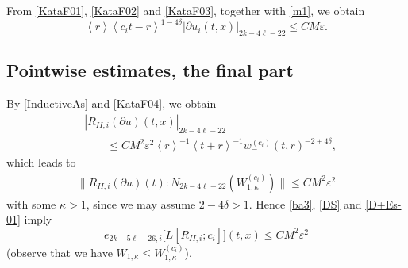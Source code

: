 \documentclass[12pt]{amsart}
\newcommand{\ve}{\varepsilon}
\newcommand{\pa}{\partial}
\newcommand{\jb}[1]{\left\langle #1 \right\rangle}
\newcommand{\norm}[2]{\|#1 \!:\! #2\|}
\numberwithin{equation}{section}
\begin{document}
From \eqref{KataF01}, \eqref{KataF02} and \eqref{KataF03}, 
together with \eqref{m1}, we obtain
\begin{equation}
\jb{r}\jb{c_it-r}^{1-4\delta}|\pa u_i(t,x)|_{2k-4\ell-22}\le 
CM\ve.
\label{KataF04}
\end{equation}
\subsection{Pointwise estimates, the final part}
By \eqref{InductiveAs} and \eqref{KataF04}, we obtain
\begin{align}
& |R_{II,i}(\pa u)(t,x)|_{2k-4\ell-22}\\
& \qquad \le CM^2\ve^2\jb{r}^{-1}\jb{t+r}^{-1}
w_-^{(c_i)}(t,r)^{-2+4\delta},
\nonumber
\end{align}
which leads to
\begin{align}
\norm{R_{II,i}(\pa u)(t)}{N_{2k-4\ell-22}(
W_{1, \kappa}^{(c_i)})}\le CM^2\ve^2
\end{align}
with some $\kappa>1$, since we may assume $2-4\delta>1$.
Hence \eqref{ba3}, \eqref{DS} and \eqref{D+Es-01}
imply
\begin{equation}
e_{2k-5\ell-26,i}\bigl[ L[R_{II,i}; c_i] \bigr]
(t,x)\le CM^2\ve^2
\label{KataF06}
\end{equation}
(observe that we have $W_{1,\kappa}\le W_{1, \kappa}^{(c_i)}$).
\end{document}
